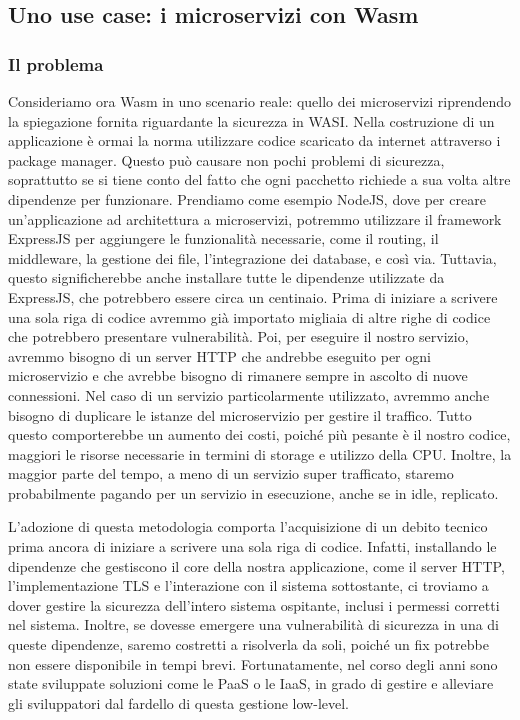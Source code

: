 \subsection{Uno use case: i microservizi con Wasm}
\subsubsection{Il problema}
Consideriamo ora Wasm in uno scenario reale: quello dei microservizi\cite{a-way-to-rethink-microservices} riprendendo
la spiegazione fornita riguardante la sicurezza in WASI. Nella costruzione di un applicazione è ormai la norma
utilizzare codice scaricato da internet attraverso i package manager. Questo può causare non pochi problemi di
sicurezza, soprattutto se si tiene conto del fatto che ogni pacchetto richiede a sua volta altre dipendenze per
funzionare. Prendiamo come esempio NodeJS, dove per creare un'applicazione ad architettura a microservizi, potremmo
utilizzare il framework ExpressJS per aggiungere le funzionalità necessarie, come il routing, il middleware, la gestione
dei file, l'integrazione dei database, e così via. Tuttavia, questo significherebbe anche installare tutte le dipendenze
utilizzate da ExpressJS, che potrebbero essere circa un centinaio. Prima di iniziare a scrivere una sola riga di codice
avremmo già importato migliaia di altre righe di codice che potrebbero presentare vulnerabilità. Poi, per eseguire il
nostro servizio, avremmo bisogno di un server HTTP che andrebbe eseguito per ogni microservizio e che avrebbe bisogno di
rimanere sempre in ascolto di nuove connessioni. Nel caso di un servizio particolarmente utilizzato, avremmo anche
bisogno di duplicare le istanze del microservizio per gestire il traffico. Tutto questo comporterebbe un aumento dei
costi, poiché più pesante è il nostro codice, maggiori le risorse necessarie in termini di storage e utilizzo della CPU.
Inoltre, la maggior parte del tempo, a meno di un servizio super trafficato, staremo probabilmente pagando per un
servizio in esecuzione, anche se in idle, replicato.

L'adozione di questa metodologia comporta l'acquisizione di un debito tecnico prima ancora di iniziare a scrivere una
sola riga di codice. Infatti, installando le dipendenze che gestiscono il core della nostra applicazione, come il server
HTTP, l'implementazione TLS e l'interazione con il sistema sottostante, ci troviamo a dover gestire la sicurezza
dell'intero sistema ospitante, inclusi i permessi corretti nel sistema. Inoltre, se dovesse emergere una vulnerabilità
di sicurezza in una di queste dipendenze, saremo costretti a risolverla da soli, poiché un fix potrebbe non essere
disponibile in tempi brevi. Fortunatamente, nel corso degli anni sono state sviluppate soluzioni come le PaaS o le IaaS,
in grado di gestire e alleviare gli sviluppatori dal fardello di questa gestione low-level.


